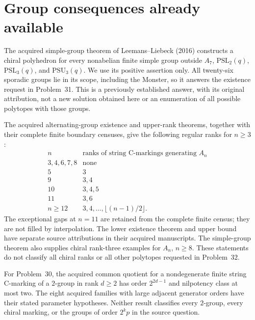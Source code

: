 \documentclass[11pt,a4paper]{article}
\begin{document}
\section{Group consequences already available}

The acquired simple-group theorem of Leemans--Liebeck (2016)
constructs a chiral polyhedron for every nonabelian finite
simple group outside $A_7$, $\mathrm{PSL}_2(q)$,
$\mathrm{PSL}_3(q)$, and $\mathrm{PSU}_3(q)$. We use its
positive assertion only. All twenty-six sporadic groups lie
in its scope, including the Monster, so it answers the
existence request in Problem~31. This is a previously
established answer, with its original attribution, not a
new solution obtained here or an enumeration of all possible
polytopes with those groups.

The acquired alternating-group existence and upper-rank
theorems, together with their complete finite boundary
censuses, give the following regular ranks for $n\ge3$:
\[
\begin{array}{c|l}
 n&\text{ranks of string C-markings generating }A_n\\\hline
 3,4,6,7,8&\text{none}\\
 5&3\\
 9&3,4\\
 10&3,4,5\\
 11&3,6\\
 n\ge12&3,4,\ldots,\lfloor(n-1)/2\rfloor.
\end{array}
\]
The exceptional gaps at $n=11$ are retained from the
complete finite census; they are not filled by interpolation.
The lower existence theorem and upper bound have separate
source attributions in their acquired manuscripts. The
simple-group theorem also supplies chiral rank-three
examples for $A_n$, $n\ge8$. These statements do not
classify all chiral ranks or all other polytopes requested
in Problem~32.

For Problem~30, the acquired common quotient for a
nondegenerate finite string C-marking of a $2$-group in
rank $d\ge2$ has order $2^{2d-1}$ and nilpotency class at
most two. The eight acquired families with large adjacent
generator orders have their stated parameter hypotheses.
Neither result classifies every $2$-group, every chiral
marking, or the groups of order $2^kp$ in the source question.
\end{document}
